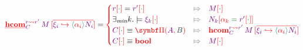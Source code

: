 \documentclass{article}
\begin{document}
\[
  \SemHCom{r}{r'}{C}{M}{
    \Vec{
      \VFace{\xi_i}{\VAbs{\alpha_i}{N_i}}
    }
  }
  =
  \FmtVal{
    \begin{cases}
      \Cond{
        \FamTest{r}{\RstId}=\FamTest{r'}{\RstId}
      }{
        \FamTest{M}{\RstId}
      }
      \\
      \Cond{
        \exists_{\textit{min}}k.\models\FamTest{\xi_k}{\RstId}
      }{
        \FamTest{N_k}{
          \RstEquate{\alpha_k}{\FamTest{r'}{\RstId}}
        }
      }
      \\
      \Cond{
        \FamTest{C}{\RstId}
        \equiv
        \VPi{A}{B}
      }{
        \VHCom{r}{r'}{C}{M}{
          \Vec{
            \VFace{\xi_i}{\VAbs{\alpha_i}{N_i}}
          }
        }
      }
      \\
      \Cond{
        \FamTest{C}{\RstId}\equiv\VBool
      }{
        \FamTest{M}{\RstId}
      }
    \end{cases}
  }
\]
\end{document}
